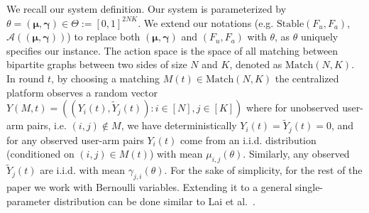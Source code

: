 \documentclass{article}
\begin{document}
We recall our system definition. Our system is parameterized by $\theta = (\boldsymbol{\mu}, \boldsymbol{\gamma}) \in  \Theta := [0,1]^{2 N K}$. We extend our notations (e.g. $\mathrm{Stable}(F_u, F_a)$, $\mathcal{A}((\boldsymbol{\mu}, \boldsymbol{\gamma}))$)  to replace both $(\boldsymbol{\mu}, \boldsymbol{\gamma})$ and $(F_u, F_a)$  with $\theta$, as $\theta$ uniquely specifies our instance.  The action space is the space of all matching between bipartite graphs between two sides of size $N$ and $K$, denoted as $\mathrm{Match}(N,K)$. In round $t$, by choosing a matching $M(t) \in \mathrm{Match}(N,K)$ the centralized platform observes a random vector $Y(M, t) = ( (Y_{i}(t), \tilde{Y}_{j}(t)) : i\in [N], j\in [K])$ where for unobserved user-arm pairs, i.e. $(i,j) \notin M$, we have deterministically $Y_{i}(t) = \tilde{Y}_{j}(t) = 0$, and for any observed user-arm pairs $Y_{i}(t)$ come from an i.i.d. distribution (conditioned on $(i,j) \in M(t)$) with mean $\mu_{i,j}(\theta)$. Similarly, any observed $\tilde{Y}_{j}(t)$ are i.i.d. with mean $\gamma_{j,i}(\theta)$. For the sake of simplicity, for the rest of the paper we work with Bernoulli variables. Extending it to a general single-parameter distribution can be done similar to Lai et al.~\cite{lai_1985}.  
\end{document}
